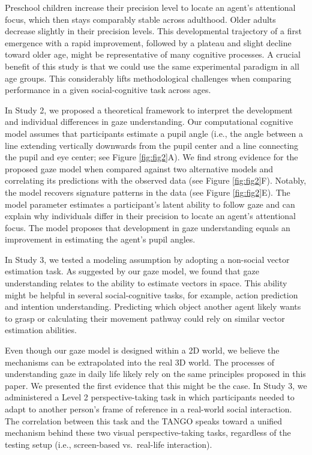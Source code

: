 \documentclass[
  man,mask,floatsintext]{apa6}
\begin{document}
Preschool children increase their precision level to locate an agent's attentional focus, which then stays comparably stable across adulthood. Older adults decrease slightly in their precision levels. This developmental trajectory of a first emergence with a rapid improvement, followed by a plateau and slight decline toward older age, might be representative of many cognitive processes. A crucial benefit of this study is that we could use the same experimental paradigm in all age groups. This considerably lifts methodological challenges when comparing performance in a given social-cognitive task across ages.

In Study 2, we proposed a theoretical framework to interpret the development and individual differences in gaze understanding. Our computational cognitive model assumes that participants estimate a pupil angle (i.e., the angle between a line extending vertically downwards from the pupil center and a line connecting the pupil and eye center; see Figure \ref{fig:fig2}A). We find strong evidence for the proposed gaze model when compared against two alternative models and correlating its predictions with the observed data (see Figure \ref{fig:fig2}F). Notably, the model recovers signature patterns in the data (see Figure \ref{fig:fig2}E). The model parameter estimates a participant's latent ability to follow gaze and can explain why individuals differ in their precision to locate an agent's attentional focus. The model proposes that development in gaze understanding equals an improvement in estimating the agent's pupil angles.

In Study 3, we tested a modeling assumption by adopting a non-social vector estimation task. As suggested by our gaze model, we found that gaze understanding relates to the ability to estimate vectors in space. This ability might be helpful in several social-cognitive tasks, for example, action prediction and intention understanding. Predicting which object another agent likely wants to grasp or calculating their movement pathway could rely on similar vector estimation abilities.

Even though our gaze model is designed within a 2D world, we believe the mechanisms can be extrapolated into the real 3D world. The processes of understanding gaze in daily life likely rely on the same principles proposed in this paper. We presented the first evidence that this might be the case. In Study 3, we administered a Level 2 perspective-taking task in which participants needed to adapt to another person's frame of reference in a real-world social interaction. The correlation between this task and the TANGO speaks toward a unified mechanism behind these two visual perspective-taking tasks, regardless of the testing setup (i.e., screen-based vs.~real-life interaction).
\end{document}
